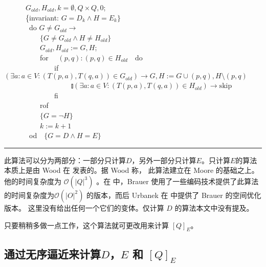 \mbox{　　　}$G_{old},H_{old},k=\emptyset ,Q \times Q,0$;\\
\mbox{　　　\{invariant:} $G=D_k \land H =E_k \}$\\
\mbox{　　　 do} $G \not= G_{old} \longrightarrow$ \\
\mbox{　　　　　}$\{G \not= G_{old} \land H \not= H_{old} \}$ \\
\mbox{　　　　　}$G_{old},H_{old}:=G,H$;\\
\mbox{　　　　　for　} $(p,q):(p,q)\in H_{old} \mbox{　do}$ \\
\mbox{　　　　　　　if} $(\exists a:a \in V : (T(p,a),T(q,a))\in G_{old} ) \longrightarrow G,H:=G \cup {(p,q)},H \setminus {(p,q)}$ \\
\mbox{　　　　　　　　　} $\talloblong (\exists a:a \in V : (T(p,a),T(q,a)) \in H_{old} ) \longrightarrow \mbox{skip} $\\
\mbox{　　　　　　　fi}\\
\mbox{　　　　　rof}\\
\mbox{　　　　　}$\{G=\neg H\}$ \\
\mbox{　　　　　}$k:=k+1$ \\
\mbox{　　　 od　}$ \{ G=D \land H=E \}$ \\
\rule{\textwidth}{1pt}
此算法可以分为两部分：一部分只计算$D$，另外一部分只计算$E$。只计算$E$的算法本质上是由 Wood 在 \cite[pg.132]{Wood87} 发表的。据 Wood 称， 此算法建立在 Moore \cite{Moor56} 的基础之上。他的时间复杂度为 $\mathcal{O}(|Q|^3)$ 。在 \cite{Brau88} 中，Brauer 使用了一些编码技术提供了此算法的时间复杂度为$\mathcal{O}(|O|^2)$ 的版本，而后 Urbanek 在 \cite{Urba89} 中提供了 Brauer 的空间优化版本。 这里没有给出任何一个它们的变体。仅计算 $D$ 的算法本文中没有提及。

只要稍稍多做一点工作，这个算法就可更改用来计算 $[Q]_E$。

\subsection{通过无序逼近来计算$D$，$E$ 和 $[Q]_E$}


